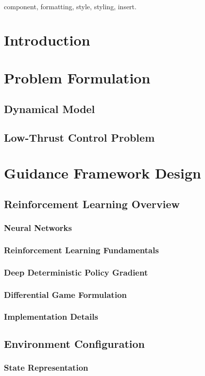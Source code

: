 \documentclass[conference]{IEEEtran}
\begin{document}
\begin{IEEEkeywords}
component, formatting, style, styling, insert.
\end{IEEEkeywords}

\section{Introduction}
\section{Problem Formulation}
\subsection{Dynamical Model}
\subsection{Low-Thrust Control Problem}
\section{Guidance Framework Design}
\subsection{Reinforcement Learning Overview}
\subsubsection{Neural Networks}
\subsubsection{Reinforcement Learning Fundamentals}
\subsubsection{Deep Deterministic Policy Gradient}
\subsubsection{Differential Game Formulation}
\subsubsection{Implementation Details}
\subsection{Environment Configuration}
\subsubsection{State Representation}
\end{document}
